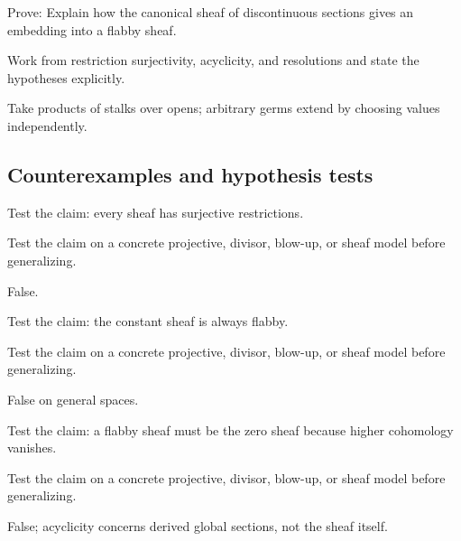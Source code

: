 \begin{exercise}\label{exr:vi46-expand-09}
Prove: Explain how the canonical sheaf of discontinuous sections gives an embedding into a flabby sheaf.
\end{exercise}
\begin{hint}
Work from restriction surjectivity, acyclicity, and resolutions and state the hypotheses explicitly.
\end{hint}
\begin{solution}
Take products of stalks over opens; arbitrary germs extend by choosing values independently.
\end{solution}

\subsection*{Counterexamples and hypothesis tests}

\begin{exercise}\label{exr:vi46-expand-10}
Test the claim: every sheaf has surjective restrictions.
\end{exercise}
\begin{hint}
Test the claim on a concrete projective, divisor, blow-up, or sheaf model before generalizing.
\end{hint}
\begin{solution}
False.
\end{solution}

\begin{exercise}\label{exr:vi46-expand-11}
Test the claim: the constant sheaf is always flabby.
\end{exercise}
\begin{hint}
Test the claim on a concrete projective, divisor, blow-up, or sheaf model before generalizing.
\end{hint}
\begin{solution}
False on general spaces.
\end{solution}

\begin{exercise}\label{exr:vi46-expand-12}
Test the claim: a flabby sheaf must be the zero sheaf because higher cohomology vanishes.
\end{exercise}
\begin{hint}
Test the claim on a concrete projective, divisor, blow-up, or sheaf model before generalizing.
\end{hint}
\begin{solution}
False; acyclicity concerns derived global sections, not the sheaf itself.
\end{solution}

